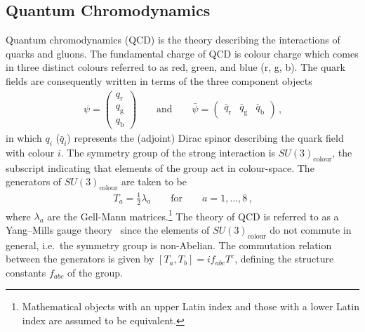 

\subsection{Quantum Chromodynamics}%
\label{sec:theory_qcd}

Quantum chromodynamics (QCD) is the theory describing the interactions of quarks
and gluons. The fundamental charge of QCD is colour charge which comes in three
distinct colours referred to as red, green, and blue (r, g, b). The quark fields
are consequently written in terms of the three component objects
\begin{align*}
  \psi =
  \begin{pmatrix}
    q_\text{r} \\
    q_\text{g} \\
    q_\text{b}
  \end{pmatrix}
  \qquad
  \text{and}
  \qquad
  \bar{\psi} =
  \begin{pmatrix}
    \bar{q}_\text{r} & \bar{q}_\text{g} & \bar{q}_\text{b}
  \end{pmatrix} \,\text{,}
\end{align*}
in which $q_i$ ($\bar{q}_i$) represents the (adjoint) Dirac spinor describing
the quark field with colour $i$. The symmetry group of the strong interaction is
$SU(3)_{\text{colour}}$, the subscript indicating that elements of the group act
in colour-space. The generators of $SU(3)_{\text{colour}}$ are taken to be
\begin{align*}
  T_a = \frac{1}{2} \lambda_a \qquad \text{for} \qquad a = 1, \dots, 8 \,\text{,}
\end{align*}
where $\lambda_a$ are the Gell-Mann matrices.\footnote{Mathematical objects with
  an upper Latin index and those with a lower Latin index are assumed to be
  equivalent.} The theory of QCD is referred to as a Yang--Mills gauge
theory~\cite{Yang:1954ek} since the elements of $SU(3)_{\text{colour}}$ do not
commute in general, i.e.\ the symmetry group is non-Abelian. The commutation
relation between the generators is given by $[T_a, T_b] = i f_{abc} T^c$,
defining the structure constants $f_{abc}$ of the group.

